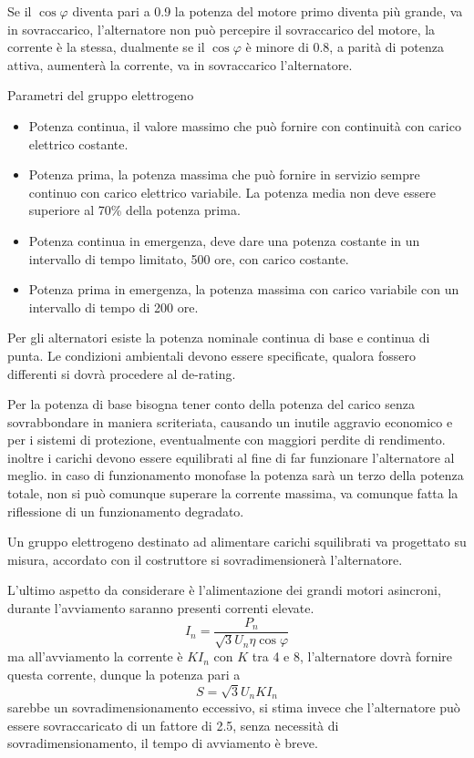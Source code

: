 Se il $\cos\varphi$ diventa pari a 0.9 la potenza del motore primo diventa più 
grande, va in sovraccarico, l'alternatore non può percepire il sovraccarico del 
motore, la corrente è la stessa, dualmente se il $\cos\varphi$ è minore di 0.8, 
a parità di potenza attiva, aumenterà la corrente, va in sovraccarico 
l'alternatore.

Parametri del gruppo elettrogeno
\begin{itemize}
    \item Potenza continua, il valore massimo che può fornire con continuità 
    con carico elettrico costante.
    \item Potenza prima, la potenza massima che può fornire in servizio sempre 
    continuo con carico elettrico variabile. La potenza media non deve essere 
    superiore al 70\% della potenza prima.
    \item Potenza continua in emergenza, deve dare una potenza costante in un 
    intervallo di tempo limitato, 500 ore, con carico costante.
    \item Potenza prima in emergenza, la potenza massima con carico variabile 
    con un intervallo di tempo di 200 ore.
\end{itemize}
Per gli alternatori esiste la potenza nominale continua di base e continua di 
punta.
Le condizioni ambientali devono essere specificate, qualora fossero differenti 
si dovrà procedere al de-rating.

Per la potenza di base bisogna tener conto della potenza del carico senza 
sovrabbondare in maniera scriteriata, causando un inutile aggravio economico e 
per i sistemi di protezione, eventualmente con maggiori perdite di rendimento.
inoltre i carichi devono essere equilibrati al fine di far funzionare 
l'alternatore al meglio. in caso di funzionamento monofase la potenza sarà un 
terzo della potenza totale, non si può comunque superare la corrente massima, 
va comunque fatta la riflessione di un funzionamento degradato.

Un gruppo elettrogeno destinato ad alimentare carichi squilibrati va progettato 
su misura, accordato con il costruttore si sovradimensionerà l'alternatore.

L'ultimo aspetto da considerare è l'alimentazione dei grandi motori asincroni, durante l'avviamento saranno presenti correnti elevate.
$$
I_n = \frac{P_n}{\sqrt{3}U_n\eta\cos\varphi}
$$
ma all'avviamento la corrente è $KI_n$ con $K$ tra 4 e 8, l'alternatore dovrà fornire questa corrente, dunque la potenza pari a
$$
S = \sqrt{3}U_nKI_n
$$
sarebbe un sovradimensionamento eccessivo, si stima invece che l'alternatore 
può essere sovraccaricato di un fattore di 2.5, senza necessità di 
sovradimensionamento, il tempo di avviamento è breve.

